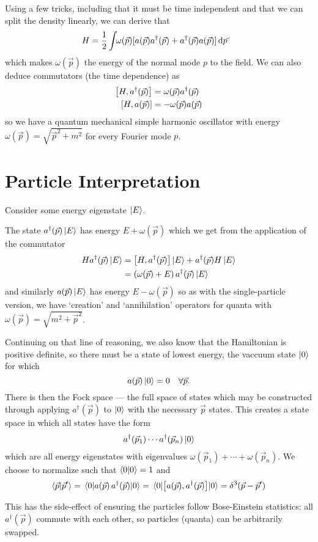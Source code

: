\documentclass[notes.tex]{subfiles}
\begin{document}
Using a few tricks, including that it must be time independent and that we can split the density linearly, we can derive that 
\begin{align*}
    H &= \frac{1}{2}\int\!\! \omega(\vec{p})[a(\vec{p})a^\dagger(\vec{p}) + a^\dagger(\vec{p})a(\vec{p})]\,\dds{p}
\end{align*}
which makes $ \omega(\vec{p})$ the energy of the normal mode $p$ to the field.
We can also deduce commutators (\ie the time dependence) as
\begin{align*}
    \commutator{H}{a^\dagger(\vec{p})} &= \omega(\vec{p}) a^\dagger(\vec{p})\\
    \commutator{H}{a(\vec{p})} &= -\omega(\vec{p}) a(\vec{p})
\end{align*}
so we have a quantum mechanical simple harmonic oscillator with energy $\omega(\vec{p}) = \sqrt{\vec{p}^2 + m^2}$ for every Fourier mode $p$.

\section{Particle Interpretation}
Consider some energy eigenstate $\ket{E}$. 

The state $a^\dagger(\vec{p})\ket{E}$ has energy $E+ \omega(\vec{p})$ which we get from the application of the commutator
\begin{align*}
    H a^\dagger(\vec{p}) \ket{E} &= \commutator{H}{a^\dagger(\vec{p})}\ket{E} + a^\dagger(\vec{p})H \ket{E}\\
    &= ( \omega(\vec{p}) + E)\, a^\dagger(\vec{p}) \ket{E}
\end{align*}
and similarly $a(\vec{p})\ket{E}$ has energy $E- \omega(\vec{p})$ so as with the single-particle version, we have `creation' and `annihilation' operators for quanta with $\omega(\vec{p}) = \sqrt{m^2 + \vec{p}^2}$. 

Continuing on that line of reasoning, we also know that the Hamiltonian is positive definite, so there must be a state of lowest energy, the vaccuum state $\ket{0}$ for which $$a(\vec{p})\ket{0} = 0 \quad\forall\vec{p}.$$
There is then the Fock space --- the full space of states which may be constructed through applying $a^\dagger(\vec{p})$ to $\ket{0}$ with the necessary $\vec{p}$ states. This creates a state space in which all states have the form 
\begin{align*}
    a^\dagger(\vec{p}_1)\cdots a^\dagger(\vec{p}_n)\ket{0}
\end{align*}
which are all energy eigenstates with eigenvalues $\omega(\vec{p}_1) + \cdots + \omega(\vec{p}_n)$. We choose to normalize such that $\braket{0}{0} = 1$ and \[\braket{\vec{p}}{\vec{p}^\prime} = \mel{0}{a(\vec{p})\,a^\dagger(\vec{p})}{0} = \mel{0}{\commutator{a(\vec{p})}{a^\dagger(\vec{p})}}{0} = \deltaslash^3(\vec{p} - \vec{p}^\prime)\]

This has the side-effect of ensuring the particles follow Bose-Einstein statistics: all $a^\dagger(\vec{p})$ commute with each other, so particles (quanta) can be arbitrarily swapped.
\end{document}
